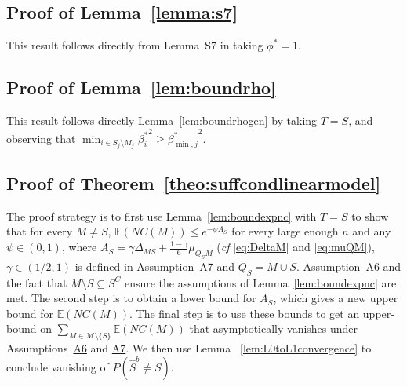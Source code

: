 \documentclass[bj,authoryear]{imsart}
\theoremstyle{plain}
\newcommand{\E}{\mathbb{E}}
\newcommand{\M}{\mathcal{M}}
\begin{document}
\subsection{Proof of Lemma~\ref{lemma:s7}}
    This result follows directly from Lemma~S7 in \cite{rossell2022concentration} taking $\phi^*=1$.

\subsection{Proof of Lemma~\ref{lem:boundrho}}
This result follows directly Lemma~\ref{lem:boundrhogen} by taking $T=S$, and observing that $\min_{i\in S_j\setminus M_j}{\beta^*_i}^2\geq {\beta^*_{\min,j}}^2$.

\subsection{Proof of Theorem~\ref{theo:suffcondlinearmodel}} 
The proof strategy is to first use Lemma~\ref{lem:boundexpnc} with $T=S$ to show that for every $M\neq S$, $\E(NC(M)) \leq e^{-\psi A_S}$ for every large enough $n$ and any $\psi \in (0,1)$, where $A_S=\gamma\Delta_{MS}+\tfrac{1-\gamma}{6}\mu_{Q_SM}$ (\emph{cf} \eqref{eq:DeltaM} and \eqref{eq:muQM}), $\gamma\in(1/2,1)$ is defined in Assumption~\hyperlink{lab:A7}{A7} and $Q_S= M\cup S$. Assumption~\hyperlink{lab:A6}{A6} and the fact that $M\setminus S\subseteq S^C$ ensure the 
assumptions of Lemma~\ref{lem:boundexpnc} are met. 
The second step is to obtain a lower bound for $A_S$, which gives a new upper bound for $\E(NC(M))$.
The final step is to use these bounds to get an upper-bound on $\sum_{M \in \M\setminus \{S\}} \E\left(NC(M)\right)$ that asymptotically vanishes under Assumptions~\hyperlink{lab:A6}{A6} and \hyperlink{lab:A7}{A7}. We then use Lemma~ \ref{lem:L0toL1convergence} to conclude vanishing of $P(\hat S^b \neq S)$. 
\end{document}
